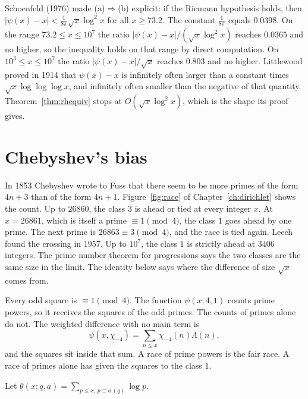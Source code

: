 \begin{remark}
Schoenfeld (1976) made (a)$\Rightarrow$(b) explicit: if the Riemann hypothesis holds, then $|\psi(x)-x|<\frac1{8\pi}\sqrt x\log^2x$ for all $x\ge73.2$. The constant $\frac1{8\pi}$ equals $0.0398$. On the range $73.2\le x\le10^7$ the ratio $|\psi(x)-x|/(\sqrt x\log^2x)$ reaches $0.0365$ and no higher, so the inequality holds on that range by direct computation. On $10^3\le x\le10^7$ the ratio $|\psi(x)-x|/\sqrt x$ reaches $0.803$ and no higher. Littlewood proved in 1914 that $\psi(x)-x$ is infinitely often larger than a constant times $\sqrt x\log\log\log x$, and infinitely often smaller than the negative of that quantity. Theorem~\ref{thm:rhequiv} stops at $O(\sqrt x\log^2x)$, which is the shape its proof gives.
\end{remark}

\section{Chebyshev's bias}

In 1853 Chebyshev wrote to Fuss that there seem to be more primes of the form $4n+3$ than of the form $4n+1$. Figure~\ref{fig:race} of Chapter~\ref{ch:dirichlet} shows the count. Up to $26860$, the class $3$ is ahead or tied at every integer $x$. At $x=26861$, which is itself a prime $\equiv1\pmod4$, the class $1$ goes ahead by one prime. The next prime is $26863\equiv3\pmod4$, and the race is tied again. Leech found the crossing in 1957. Up to $10^7$, the class $1$ is strictly ahead at $3406$ integers. The prime number theorem for progressions says the two classes are the same size in the limit. The identity below says where the difference of size $\sqrt x$ comes from.

Every odd square is $\equiv1\pmod4$. The function $\psi(x;4,1)$ counts prime powers, so it receives the squares of the odd primes. The counts of primes alone do not. The weighted difference with no main term is
\[
\psi(x,\chi_{-4})=\sum_{n\le x}\chi_{-4}(n)\Lambda(n),
\]
and the squares sit inside that sum. A race of prime powers is the fair race. A race of primes alone has given the squares to the class $1$.

Let $\theta(x;q,a)=\sum_{p\le x,\,p\equiv a\,(q)}\log p$.

